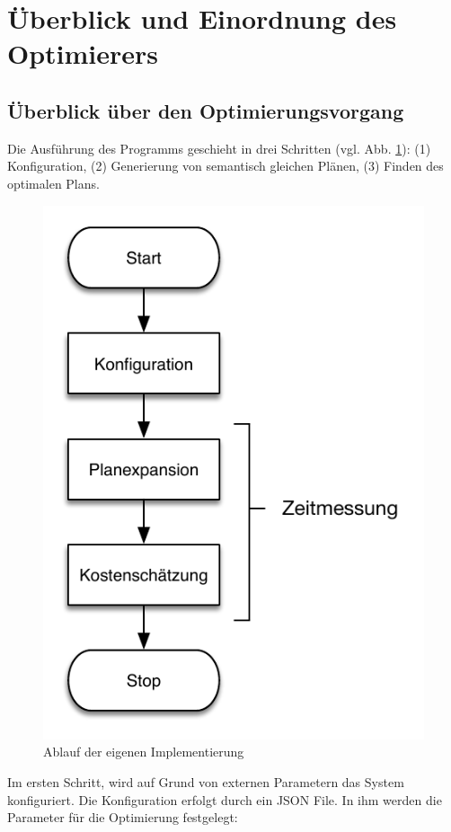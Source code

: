 \section{Überblick und Einordnung des Optimierers}

\subsection{Überblick über den Optimierungsvorgang}


Die Ausführung des Programms geschieht in drei Schritten (vgl. Abb. \ref{Ablauf}): (1) Konfiguration, (2) Generierung von semantisch gleichen Plänen, (3) Finden des optimalen Plans.

\begin{figure}[h]
  \centering
  \includegraphics{04_Implementierung/Ablauf.pdf}
  \caption{Ablauf der eigenen Implementierung}
  \label{Ablauf}
\end{figure}


Im ersten Schritt, wird auf Grund von externen Parametern das System konfiguriert. Die Konfiguration erfolgt durch ein JSON File. In ihm werden die Parameter für die Optimierung festgelegt:

